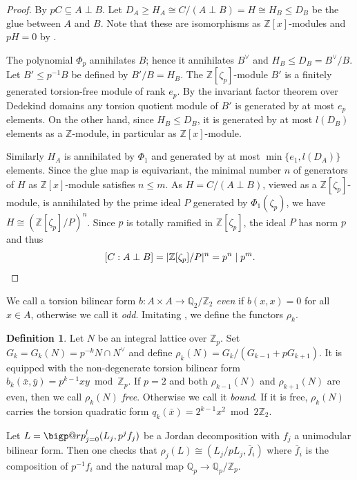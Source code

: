 \documentclass[a4paper]{amsart}
\makeatletter
\theoremstyle{definition}
\newtheorem{definition}{Definition}[section]
\theoremstyle{plain}
\newcommand{\QQ}{\mathbb{Q}}
\newcommand{\ZZ}{\mathbb{Z}}
\newcommand{\bigperp}{%
  \mathop{\mathpalette\bigp@rp\relax}%
  \displaylimits
}
\newcommand{\bigp@rp}[2]{%
  \vcenter{
    \m@th\hbox{\scalebox{\ifx#1\displaystyle2.1\else1.5\fi}{$#1\perp$}}
  }%
}
\makeatother
\begin{document}
\begin{proof}
By  $p C \subseteq A \perp B$.
Let $D_A \geq H_A \cong C/(A\perp B) =H\cong H_B \leq D_B$ be the glue between $A$ and $B$. Note that these are isomorphisms as $\ZZ[x]$-modules and $p H =0$ by .

The polynomial $\Phi_p$ annihilates $B$; hence it annihilates $B^\vee$ and $H_B \leq D_B=B^\vee/B$.
%
Let $B' \leq p^{-1}B$ be defined by $B'/B = H_B$.
%
%
The $\ZZ[\zeta_p]$-module $B'$ is a finitely generated torsion-free module of rank $e_p$.
  By the invariant factor theorem over Dedekind domains \cite[(22.13)]{curtis2006} any torsion quotient module of $B'$ is generated by at most $e_p$ elements.
On the other hand, since $H_B \leq D_B$, it is generated by at most $l(D_B)$ elements as a $\ZZ$-module, in particular as $\ZZ[x]$-module.

Similarly $H_A$ is annihilated by $\Phi_1$ and generated by at most $\min\{e_1,l(D_A)\}$ elements.
Since the glue map is equivariant, the minimal number $n$ of generators of $H$ as $\ZZ[x]$-module satisfies $n \leq m$.
As $H=C/(A\perp B)$, viewed as a $\ZZ[\zeta_p]$-module, is annihilated by the prime ideal $P$ generated by $\Phi_1(\zeta_p)$, we have $H\cong (\ZZ[\zeta_p]/P)^n$.
Since $p$ is totally ramified in $\ZZ[\zeta_p]$, the ideal $P$ has norm $p$ and thus
\[[C:A\perp B]=|\ZZ[\zeta_p]/P|^n = p^n \mid p^m. \qedhere\]
\end{proof}

We call a torsion bilinear form $b \colon A \times A \to \QQ_2/\ZZ_2$ \emph{even }if $b(x,x)=0$ for all $x \in A$, otherwise we call it \emph{odd}.
Imitating \cite[II \S 2]{miranda-morrison}, we define the functors $\rho_k$.

\begin{definition}
  Let $N$ be an integral lattice over $\ZZ_p$. Set $G_k = G_k(N) = p^{-k}N \cap N^\vee$ and define
 $\rho_k(N) = G_k/(G_{k-1}+pG_{k+1})$. It is equipped with the non-degenerate torsion bilinear form $b_k(\bar x,\bar y) = p^{k-1}xy \bmod \ZZ_p$.
 If $p=2$ and both $\rho_{k-1}(N)$ and $\rho_{k+1}(N)$ are even, then we call $\rho_{k}(N)$ \emph{free}. Otherwise we call it \emph{bound}. If it is free, $\rho_{k}(N)$ carries the torsion quadratic form $q_k(\bar x) = 2^{k-1}x^2 \bmod 2\ZZ_2$.
\end{definition}
Let $L=\bigperp_{j=0}^l (L_j,p^jf_{j})$ be a Jordan decomposition with $f_{j}$ a unimodular bilinear form. Then one checks that
$\rho_j(L) \cong (L_j/pL_j, \bar f_i)$ where $\bar f_i$ is the composition of $p^{-1}f_i$ and the natural map $\QQ_p \to \QQ_p/\ZZ_p$.
\end{document}
